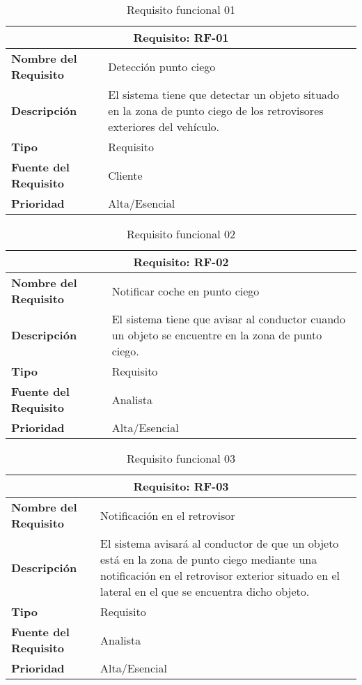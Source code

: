 \begin{table}[H]
\begin{center}
\begin{tabular}{p{} p{7cm}}
\multicolumn{2}{c}{\textbf{Requisito: RF-01} } \\
\hline \hline
\textbf{Nombre del Requisito} & Detección punto ciego  \\
\hline
\textbf{Descripción} & El sistema tiene que detectar un objeto situado en la zona de punto ciego de los retrovisores exteriores del vehículo.  \\
\hline
\textbf{Tipo} & Requisito  \\
\hline
\textbf{Fuente del Requisito} & Cliente  \\
\hline
\textbf{Prioridad} & Alta/Esencial  \\ \hline
\end{tabular}
\caption{Requisito funcional 01}
\label{tab:RF-01}
\end{center}
\end{table}

\begin{table}[H]
\begin{center}
\begin{tabular}{p{} p{7cm}}
\multicolumn{2}{c}{\textbf{Requisito: RF-02} } \\
\hline \hline
\textbf{Nombre del Requisito} & Notificar coche en punto ciego  \\
\hline
\textbf{Descripción} & El sistema tiene que avisar al conductor cuando un objeto se encuentre en la zona de punto ciego. \\
\hline
\textbf{Tipo} & Requisito  \\
\hline
\textbf{Fuente del Requisito} & Analista  \\
\hline
\textbf{Prioridad} & Alta/Esencial  \\ \hline
\end{tabular}
\caption{Requisito funcional 02}
\label{tab:RF-02}
\end{center}
\end{table}

\begin{table}[H]
\begin{center}
\begin{tabular}{p{} p{7cm}}
\multicolumn{2}{c}{\textbf{Requisito: RF-03} } \\
\hline \hline
\textbf{Nombre del Requisito} & Notificación en el retrovisor \\
\hline
\textbf{Descripción} & El sistema avisará al conductor de que un objeto está en la zona de punto ciego mediante una notificación en el retrovisor exterior situado en el lateral en el que se encuentra dicho objeto.\\
\hline
\textbf{Tipo} & Requisito  \\
\hline
\textbf{Fuente del Requisito} & Analista  \\
\hline
\textbf{Prioridad} & Alta/Esencial  \\ \hline
\end{tabular}
\caption{Requisito funcional 03}
\label{tab:RF-03}
\end{center}
\end{table}

